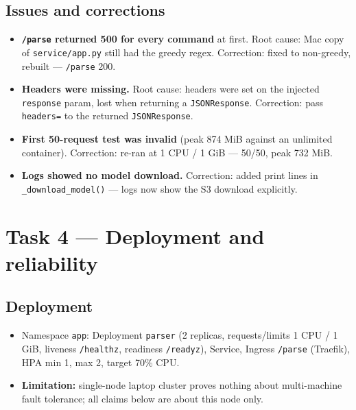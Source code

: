 \documentclass[11pt,a4paper]{article}
\begin{document}
\subsection*{Issues and corrections}
\begin{itemize}
\item \textbf{\texttt{/parse} returned 500 for every command} at first. Root cause: Mac copy of \texttt{service/app.py} still had the greedy regex. Correction: fixed to non-greedy, rebuilt --- \texttt{/parse} 200.
\item \textbf{Headers were missing.} Root cause: headers were set on the injected \texttt{response} param, lost when returning a \texttt{JSONResponse}. Correction: pass \texttt{headers=} to the returned \texttt{JSONResponse}.
\item \textbf{First 50-request test was invalid} (peak 874 MiB against an unlimited container). Correction: re-ran at 1 CPU / 1 GiB --- 50/50, peak 732 MiB.
\item \textbf{Logs showed no model download.} Correction: added print lines in \texttt{\_download\_model()} --- logs now show the S3 download explicitly.
\end{itemize}

\section{Task 4 --- Deployment and reliability}
\subsection*{Deployment}
\begin{itemize}
\item Namespace \texttt{app}: Deployment \texttt{parser} (2 replicas, requests/limits 1 CPU / 1 GiB, liveness \texttt{/healthz}, readiness \texttt{/readyz}), Service, Ingress \texttt{/parse} (Traefik), HPA min 1, max 2, target 70\% CPU.
\item \textbf{Limitation:} single-node laptop cluster proves nothing about multi-machine fault tolerance; all claims below are about this node only.
\end{itemize}
\end{document}
